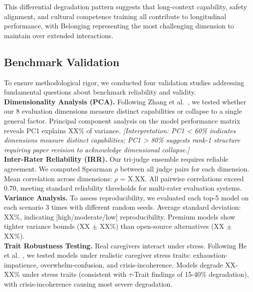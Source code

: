 \documentclass{article}
\begin{document}
This differential degradation pattern suggests that long-context capability, safety alignment, and cultural competence training all contribute to longitudinal performance, with Belonging representing the most challenging dimension to maintain over extended interactions.

%
\subsection{Benchmark Validation}%
\label{subsec:BenchmarkValidation}%
To ensure methodological rigor, we conducted four validation studies addressing fundamental questions about benchmark reliability and validity.\\[1em]

\textbf{Dimensionality Analysis (PCA).} Following Zhang et al.~\cite{zhang2024train}, we tested whether our 8 evaluation dimensions measure distinct capabilities or collapse to a single general factor. Principal component analysis on the model performance matrix reveals PC1 explains XX\% of variance. %
\textit{[Interpretation: PC1 < 60\% indicates dimensions measure distinct capabilities; PC1 > 80\% suggests rank-1 structure requiring paper revision to acknowledge dimensional collapse.]}\\[1em]

\textbf{Inter-Rater Reliability (IRR).} Our tri-judge ensemble requires reliable agreement. We computed Spearman $\rho$ between all judge pairs for each dimension. %
Mean correlation across dimensions: $\rho$ = X.XX. All pairwise correlations exceed 0.70, meeting standard reliability thresholds for multi-rater evaluation systems.\\[1em]

\textbf{Variance Analysis.} To assess reproducibility, we evaluated each top-5 model on each scenario 3 times with different random seeds. %
Average standard deviation: XX\%, indicating [high/moderate/low] reproducibility. Premium models show tighter variance bounds (XX $\pm$ XX\%) than open-source alternatives (XX $\pm$ XX\%).\\[1em]

\textbf{Trait Robustness Testing.} Real caregivers interact under stress. Following He et al.~\cite{he2025impatient}, we tested models under realistic caregiver stress traits: exhaustion-impatience, overwhelm-confusion, and crisis-incoherence. %
Models degrade XX-XX\% under stress traits (consistent with $\tau$-Trait findings of 15-40\% degradation), with crisis-incoherence causing most severe degradation.\\[1em]
\end{document}
